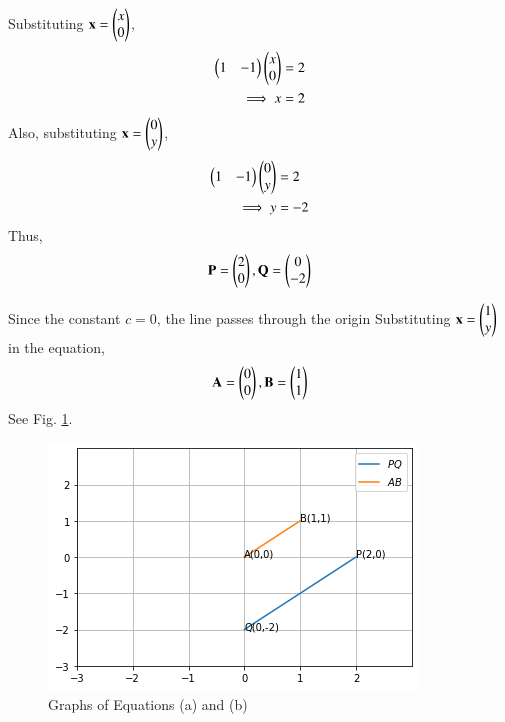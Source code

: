 
    \item Substituting $\mathbf{x}=\begin{pmatrix}x\\0\end{pmatrix}$,
\begin{align}
    \begin{pmatrix}1&-1\end{pmatrix}\begin{pmatrix}x\\0\end{pmatrix}&=2\\
    \implies  x&=2
\end{align}
Also, substituting $\mathbf{x}=\begin{pmatrix}0\\y\end{pmatrix}$,
\begin{align}
\begin{pmatrix}1&-1\end{pmatrix}\begin{pmatrix}0\\y\end{pmatrix}&=2\\
\implies y&=-2
\end{align}
Thus, 
\begin{align}
   \mathbf{P}=\begin{pmatrix}2\\0\end{pmatrix},\mathbf{Q}=\begin{pmatrix}0\\-2\end{pmatrix} 
\end{align}
\item Since the constant $c = 0$,
the line  passes through the origin
Substituting  $\mathbf{x}=\begin{pmatrix}1\\y\end{pmatrix}$ in the equation,
\begin{align}
    \mathbf{A}=\begin{pmatrix}0\\0\end{pmatrix},\mathbf{B}=\begin{pmatrix}1\\1\end{pmatrix}
\end{align}
See Fig. \ref{sep/2/3/beGraphical solution}.
\begin{figure}[ht]
    \centering
    \includegraphics[width=\columnwidth]{solutions/sep/2/3/be/Python Img.png}
    \caption{Graphs of Equations (a) and (b)}
    \label{sep/2/3/beGraphical solution}
\end{figure}
